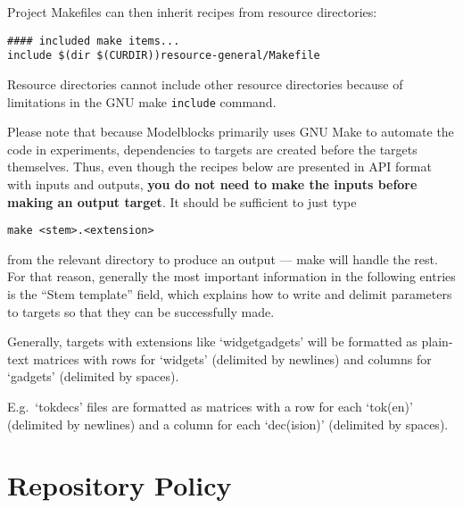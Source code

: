 \documentclass[12pt]{report}
\def\blue{\color{blue}}
\def\magenta{\color{magenta}}
\def\red{\color{red}}
\begin{document}
Project Makefiles can then inherit recipes from resource directories:
%
{\magenta\begin{verbatim}
#### included make items...
include $(dir $(CURDIR))resource-general/Makefile
\end{verbatim}
}

Resource directories {\red cannot} include other resource directories because of limitations in the GNU make {\blue\tt include} command.

Please note that because Modelblocks primarily uses GNU Make to automate the code in experiments, dependencies to targets are created before the targets themselves. Thus, even though the recipes below are presented in API format with inputs and outputs, \textbf{you do not need to make the inputs before making an output target}. It should be sufficient to just type

\vspace{1em}

{\blue\tt make <stem>.<extension>}

\vspace{1em}

from the relevant directory to produce an output --- make will handle the rest. For that reason, generally the most important information in the following entries is the ``Stem template'' field, which explains how to write and delimit parameters to targets so that they can be successfully made.

Generally, targets with extensions like `widgetgadgets' will be formatted as plain-text matrices with rows for `widgets' (delimited by newlines) and columns for `gadgets' (delimited by spaces).

E.g.\ `tokdecs' files are formatted as matrices with a row for each `tok(en)' (delimited by newlines) and a column for each `dec(ision)' (delimited by spaces).






\chapter{Repository Policy}
\end{document}
